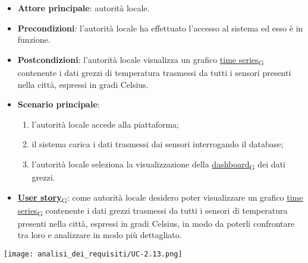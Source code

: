 \begin{itemize}
	\item \textbf{Attore principale}: autorità locale.
	\item \textbf{Precondizioni}: l'autorità locale ha effettuato l'accesso al sistema ed esso è in funzione.
	\item \textbf{Postcondizioni}: l'autorità locale visualizza un grafico \href{https://7last.github.io/docs/pb/documentazione-interna/glossario\#time-series}{time series\textsubscript{G}} contenente i dati grezzi di temperatura trasmessi da tutti i sensori
	      presenti nella città, espressi in gradi Celsius.
	\item \textbf{Scenario principale}:
	      \begin{enumerate}
		      \item l'autorità locale accede alla piattaforma;
		      \item il sistema carica i dati trasmessi dai sensori interrogando il database;
		      \item l'autorità locale seleziona la visualizzazione della \href{https://7last.github.io/docs/pb/documentazione-interna/glossario\#dashboard}{dashboard\textsubscript{G}} dei dati grezzi.
	      \end{enumerate}
	\item \href{https://7last.github.io/docs/pb/documentazione-interna/glossario\#user-story}{\textbf{User story}\textsubscript{G}}:
	      come autorità locale desidero poter visualizzare un grafico \href{https://7last.github.io/docs/pb/documentazione-interna/glossario\#time-series}{time series\textsubscript{G}} contenente i dati grezzi trasmessi da tutti i sensori
	      di temperatura presenti nella città, espressi in gradi Celsius, in modo da poterli confrontare tra loro e analizzare in modo più dettagliato.
\end{itemize}
\begin{center}
	\texttt{[image: analisi\_dei\_requisiti/UC-2.13.png]}
\end{center}


